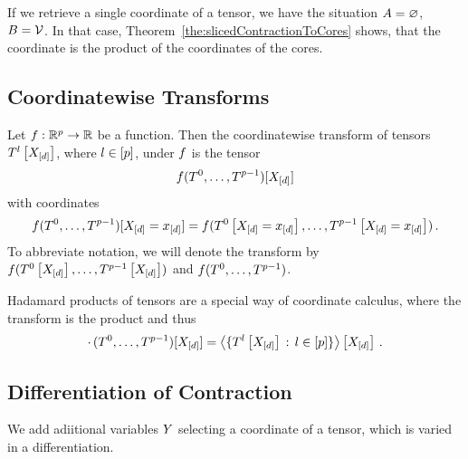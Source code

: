 If we retrieve a single coordinate of a tensor, we have the situation $A=\varnothing$, $B=\mathcal{V}$.
In that case, Theorem~\ref{the:slicedContractionToCores} shows, that the coordinate is the product of the coordinates of the cores. %


\subsection{Coordinatewise Transforms}



\begin{definition}\label{def:coordinateCalculus}
	Let $f: \mathbb{R}^{p} \rightarrow \mathbb{R}$ be a function.
	Then the coordinatewise transform of tensors $T^{l}\left[X_{[d]}\right]$, where $l\in[p]$, under $f$ is the tensor
		\[ f(T^{0},\ldots,T^{p-1})[X_{[d]}] \]
	with coordinates
		\[ f(T^{0},\ldots,T^{p-1})[X_{[d]}=x_{[d]}] 
		= f(T^{0}\left[X_{[d]}=x_{[d]}\right],\ldots,T^{p-1}\left[X_{[d]}=x_{[d]}\right]) \, .  \]	
	To abbreviate notation, we will denote the transform by $f(T^{0}\left[X_{[d]}\right],\ldots,T^{p-1}\left[X_{[d]}\right])$ and $f(T^{0},\ldots,T^{p-1})$.
\end{definition}

\begin{example}
	Hadamard products of tensors are a special way of coordinate calculus, where the transform is the product and thus
		\[ \cdot \, (T^{0},\ldots,T^{p-1})[X_{[d]}] 
		= \left\langle \{T^{l}\left[X_{[d]}\right] \, : \, l\in[p] \}\right\rangle \left[ X_{[d]} \right] \, . \]
\end{example}




\subsection{Differentiation of Contraction}

We add adiitional variables $Y$ selecting a coordinate of a tensor, which is varied in a differentiation.

